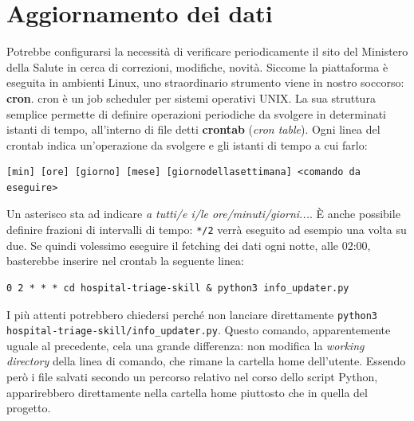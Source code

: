 \section{Aggiornamento dei dati}
Potrebbe configurarsi la necessità di verificare periodicamente il sito del Ministero della Salute in cerca di correzioni, modifiche, novità. Siccome la piattaforma è eseguita in ambienti Linux, uno straordinario strumento viene in nostro soccorso: \textbf{cron}. cron è un job scheduler per sistemi operativi UNIX. La sua struttura semplice permette di definire operazioni periodiche da svolgere in determinati istanti di tempo, all'interno di file detti \textbf{crontab} (\textit{cron table}). Ogni linea del crontab indica un'operazione da svolgere e gli istanti di tempo a cui farlo:
\begin{verbatim}
[min] [ore] [giorno] [mese] [giornodellasettimana] <comando da eseguire>
\end{verbatim}
Un asterisco sta ad indicare \textit{a tutti/e i/le ore/minuti/giorni...}. È anche possibile definire frazioni di intervalli di tempo: \texttt{*/2} verrà eseguito ad esempio una volta su due. Se quindi volessimo eseguire il fetching dei dati ogni notte, alle 02:00, basterebbe inserire nel crontab la seguente linea:
\begin{verbatim}
0 2 * * * cd hospital-triage-skill & python3 info_updater.py
\end{verbatim}
I più attenti potrebbero chiedersi perché non lanciare direttamente \texttt{python3 hospital-triage-skill/info\_updater.py}. Questo comando, apparentemente uguale al precedente, cela una grande differenza: non modifica la \textit{working directory} della linea di comando, che rimane la cartella home dell'utente. Essendo però i file salvati secondo un percorso relativo nel corso dello script Python, apparirebbero direttamente nella cartella home piuttosto che in quella del progetto.